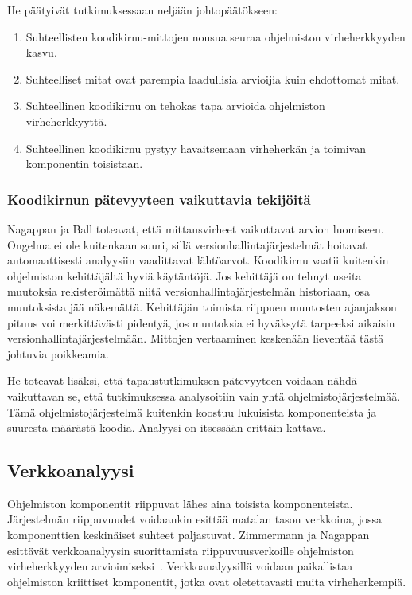 \documentclass[finnish]{../tktltiki2}
\theoremstyle{definition}
\theoremstyle{remark}
\begin{document}
\noindent He päätyivät tutkimuksessaan neljään johtopäätökseen:

\begin{enumerate}

    \item Suhteellisten koodikirnu-mittojen nousua seuraa ohjelmiston virheherkkyyden kasvu.

    \item Suhteelliset mitat ovat parempia laadullisia arvioijia kuin ehdottomat mitat.

    \item Suhteellinen koodikirnu on tehokas tapa arvioida ohjelmiston virheherkkyyttä.

    \item Suhteellinen koodikirnu pystyy havaitsemaan virheherkän ja toimivan komponentin toisistaan.

\end{enumerate}

\subsubsection{Koodikirnun pätevyyteen vaikuttavia tekijöitä}

Nagappan ja Ball toteavat, että mittausvirheet vaikuttavat arvion luomiseen. Ongelma ei ole kuitenkaan suuri, sillä 
versionhallintajärjestelmät hoitavat automaattisesti analyysiin vaadittavat lähtöarvot. Koodikirnu vaatii kuitenkin 
ohjelmiston kehittäjältä hyviä käytäntöjä. Jos kehittäjä on tehnyt useita muutoksia rekisteröimättä niitä 
versionhallintajärjestelmän historiaan, osa muutoksista jää näkemättä. Kehittäjän toimista riippuen muutosten ajanjakson 
pituus voi merkittävästi pidentyä, jos muutoksia ei hyväksytä tarpeeksi aikaisin versionhallintajärjestelmään. Mittojen 
vertaaminen keskenään lieventää tästä johtuvia poikkeamia.

    He toteavat lisäksi, että tapaustutkimuksen pätevyyteen voidaan nähdä vaikuttavan se, että tutkimuksessa 
analysoitiin vain yhtä ohjelmistojärjestelmää. Tämä ohjelmistojärjestelmä kuitenkin koostuu lukuisista komponenteista 
ja suuresta määrästä koodia. Analyysi on itsessään erittäin kattava.

\subsection{Verkkoanalyysi}

Ohjelmiston komponentit riippuvat lähes aina toisista komponenteista. Järjes\-telmän riippuvuudet voidaankin esittää 
matalan tason verkkoina, jossa komponenttien keskinäiset suhteet paljastuvat. Zimmermann ja Nagappan esittävät 
verkkoanalyysin suorittamista riippuvuusverkoille ohjelmiston virheherkkyyden arvioimiseksi~\cite{ZN08}. 
Verkkoanalyysillä voidaan paikallistaa ohjelmiston kriittiset komponentit, jotka ovat oletettavasti muita 
virheherkempiä.
\end{document}
